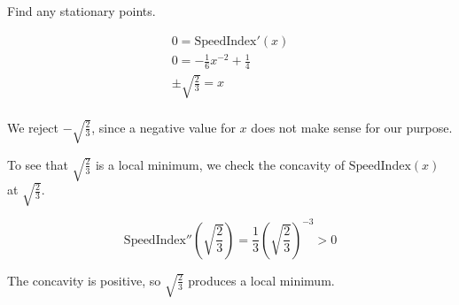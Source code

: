 \documentclass{letter}
\begin{document}
\begin{problem}{}
{{        Find any stationary points.

        \begin{gather*}
          0 = \text{SpeedIndex}'(x) \\
          0 = - \frac{1}{6}x^{-2} + \frac{1}{4} \\
          \pm \sqrt{\frac{2}{3}} = x \\
        \end{gather*}

        We reject $-\sqrt{\frac{2}{3}}$, since a negative value for $x$
        does not make sense for our purpose.

        To see that $\sqrt{\frac{2}{3}}$ is a local minimum, we check
        the concavity of $\text{SpeedIndex}(x)$ at $\sqrt{\frac{2}{3}}$.

        \[
          \text{SpeedIndex}''\left(\sqrt{\frac{2}{3}}\right)
          = \frac{1}{3}\left(\sqrt{\frac{2}{3}}\right)^{-3}
          > 0
        \]

        The concavity is positive, so $\sqrt{\frac{2}{3}}$ produces
        a local minimum.
      }
    }
  \end{problem}
\end{document}
